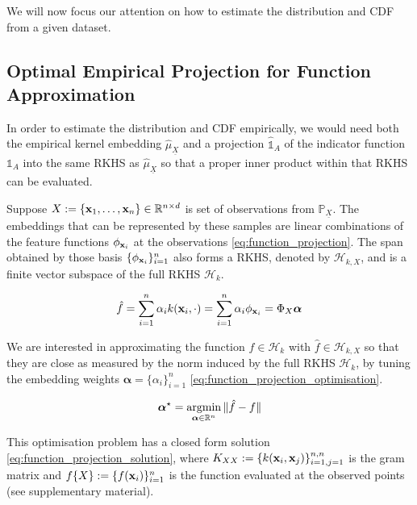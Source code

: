 \documentclass[twoside]{article} \usepackage{aistats2017}
\theoremstyle{definition}
\theoremstyle{remark}
\newcommand{\argmin}{\operatornamewithlimits{argmin}}
\newcommand{\rv}[1]{\underline{#1}}
\newcommand{\ds}[1]{{#1}}
\begin{document}
	We will now focus our attention on how to estimate the distribution and CDF from a given dataset.
	
	\subsection{Optimal Empirical Projection for Function Approximation}
	\label{sec:discriminative_quantile_regression:optimal_function_approximation}
	
		In order to estimate the distribution and CDF empirically, we would need both the empirical kernel embedding $\hat{\mu}_{\rv{X}}$ and a projection $\hat{\mathbb{1}}_{A}$ of the indicator function $\mathbb{1}_{A}$ into the same RKHS as $\hat{\mu}_{\rv{X}}$ so that a proper inner product within that RKHS can be evaluated.

		Suppose $\ds{X} := \{\bvec{x}_{1}, \dots, \bvec{x}_{n}\} \in \mathbb{R}^{n \times d}$ is set of observations from $\mathbb{P}_{\rv{X}}$. The embeddings that can be represented by these samples are linear combinations of the feature functions $\phi_{\mathbf{x}_{i}}$ at the observations \eqref{eq:function_projection}. The span obtained by those basis $\{\phi_{\mathbf{x}_{i}}\}_{i = 1}^{n}$ also forms a RKHS, denoted by $\mathcal{H}_{k, \ds{X}}$, and is a finite vector subspace of the full RKHS $\mathcal{H}_{k}$.
		
		\begin{equation}
			\hat{f} = \sum_{i = 1}^{n} \alpha_{i} k(\bvec{x}_{i}, \cdot) = \sum_{i = 1}^{n} \alpha_{i} \phi_{\bvec{x}_{i}} = \Phi_{\ds{X}} \bm{\alpha}
		\label{eq:function_projection}
		\end{equation}
	
		We are interested in approximating the function $f \in \mathcal{H}_{k}$ with $\hat{f} \in \mathcal{H}_{k, \ds{X}}$ so that they are close as measured by the norm induced by the full RKHS $\mathcal{H}_{k}$, by tuning the embedding weights $\bm{\alpha} = \{\alpha_{i}\}_{i = 1}^{n}$ \eqref{eq:function_projection_optimisation}.
			
		\begin{equation}
			\bm{\alpha}^{\star} = \argmin_{\bm{\alpha} \in \mathbb{R}^{n}} \Vert \hat{f} - f \Vert
		\label{eq:function_projection_optimisation}
		\end{equation}
		
		This optimisation problem has a closed form solution \eqref{eq:function_projection_solution}, where $K_{\ds{X} \ds{X}} := \{k(\bvec{x}_{i}, \bvec{x}_{j})\}_{i = 1, j = 1}^{n, n}$ is the gram matrix and $f\{\ds{X}\} := \{f(\bvec{x}_{i})\}_{i = 1}^{n}$ is the function evaluated at the observed points (see supplementary material).
		
\end{document}

